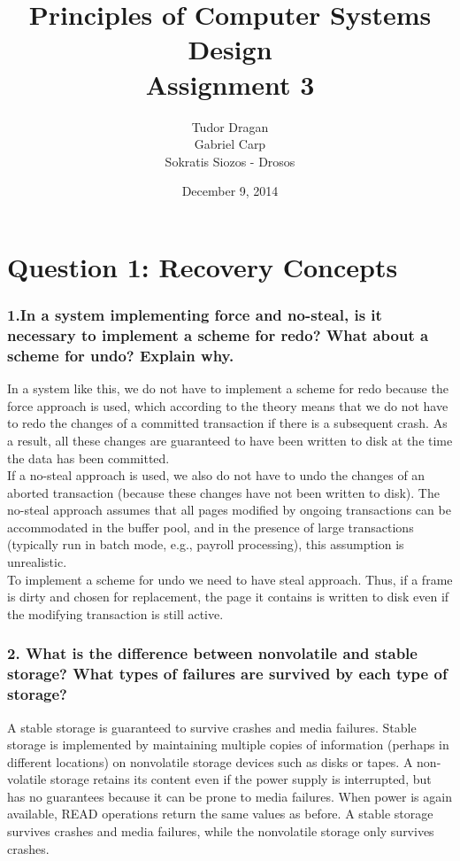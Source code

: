 \documentclass{article}      %
\title{\bf Principles of Computer Systems Design\\ {\Large Assignment 3}}  %
\author{Tudor Dragan\\
Gabriel Carp\\
Sokratis Siozos - Drosos}      %
\date{December 9, 2014}      %
\begin{document}

\maketitle                   %

\section*{Question 1: Recovery Concepts} 


\subsubsection*{1.In a system implementing force and no-steal, is it necessary to implement a scheme for redo? What about a scheme for undo? Explain why.}

In a system like this, we do not have to implement a scheme for redo because the force approach is used, which according to the theory means that we do not have to redo the changes of a committed transaction if there is a subsequent crash. As a result, all these changes are guaranteed to have been written to disk at the time the data has been committed. \\

If a no-steal approach is used, we also do not have to undo the changes of an aborted transaction (because these changes have not been written to disk). The no-steal approach assumes that all pages modified by ongoing transactions can be accommodated in the buffer pool, and in the presence of large transactions (typically run in batch mode, e.g., payroll processing), this assumption is unrealistic. \\

To implement a scheme for undo we need to have steal approach. Thus, if a frame is dirty and chosen for replacement, the page it contains is written to disk even if the modifying transaction is still active. 

\subsubsection*{2.  What is the difference between nonvolatile and stable storage? What types of failures are survived by each type of storage?}

A stable storage is guaranteed to survive crashes and media failures. Stable storage is implemented by maintaining multiple copies of information (perhaps in different locations) on nonvolatile storage devices such as disks or tapes. A non-volatile storage retains its content even if the power supply is interrupted, but has no guarantees because it can be prone to media failures. When power is again available, READ operations return the same values as before. A stable storage survives crashes and media failures, while the nonvolatile storage only survives crashes.\\
\end{document}
